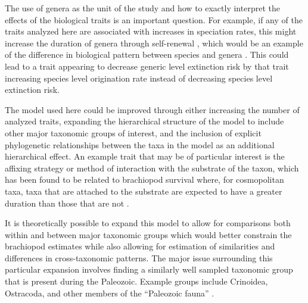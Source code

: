 \documentclass{article}
\begin{document}
The use of genera as the unit of the study and how to exactly interpret the effects of the biological traits is an important question. For example, if any of the traits analyzed here are associated with increases in speciation rates, this might increase the duration of genera through self-renewal \citep{Raup1991b,Raup1994}, which would be an example of the difference in biological pattern between species and genera \citep{Jablonski1987,Jablonski2007,Jablonski2008a}. This could lead to a trait appearing to decrease generic level extinction risk by that trait increasing species level origination rate instead of decreasing species level extinction risk. %

The model used here could be improved through either increasing the number of analyzed traits, expanding the hierarchical structure of the model to include other major taxonomic groups of interest, and the inclusion of explicit phylogenetic relationships between the taxa in the model as an additional hierarchical effect. An example trait that may be of particular interest is the affixing strategy or method of interaction with the substrate of the taxon, which has been found to be related to brachiopod survival where, for cosmopolitan taxa, taxa that are attached to the substrate are expected to have a greater duration than those that are not \citep{Alexander1977}.

It is theoretically possible to expand this model to allow for comparisons both within and between major taxonomic groups which would better constrain the brachiopod estimates while also allowing for estimation of similarities and differences in cross-taxonomic patterns. The major issue surrounding this particular expansion involves finding a similarly well sampled taxonomic group that is present during the Paleozoic. Example groups include Crinoidea, Ostracoda, and other members of the ``Paleozoic fauna'' \citep{Sepkoski1981a}.
\end{document}
